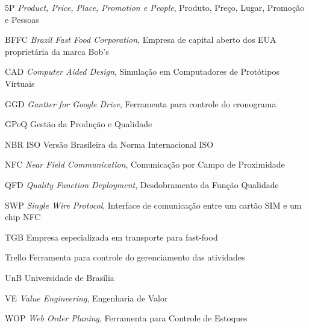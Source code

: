\begin{siglas}
	\item[5P] \emph{Product, Price, Place, Promotion e People}, Produto, Preço, Lugar, Promoção e Pessoas
	\item[BFFC] \emph{Brazil Fast Food Corporation}, Empresa de capital aberto dos EUA proprietária da marca Bob's
	\item[CAD] \emph{Computer Aided Design}, Simulação em Computadores de Protótipos Virtuais 
	\item[GGD] \emph{Gantter for Google Drive},  Ferramenta para controle do cronograma
	\item[GPeQ] Gestão da Produção e Qualidade
	\item[NBR ISO] Versão Brasileira da Norma Internacional ISO
	\item[NFC] \emph{Near Field Communication}, Comunicação por Campo de Proximidade
	\item[QFD] \emph{Quality Function Deployment}, Desdobramento da Função Qualidade
	\item[SWP] \emph{Single Wire Protocol}, Interface de comunicação entre um cartão SIM e um chip NFC
	\item[TGB] Empresa especializada em transporte para fast-food
	\item[Trello] Ferramenta para controle do gerenciamento das atividades
	\item[UnB] Universidade de Brasília
	\item[VE] \emph{Value Engineering}, Engenharia de Valor
	\item[WOP] \emph{Web Order Planing}, Ferramenta para Controle de Estoques
\end{siglas}
